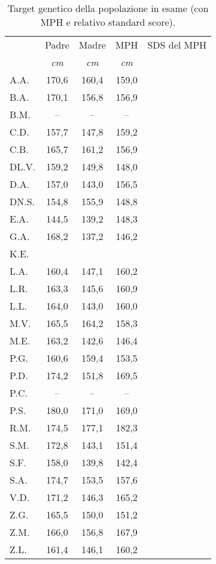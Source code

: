 \begin{table}[!h]
\begin{center}
\addtolength{\tabcolsep}{12pt}
\renewcommand{\arraystretch}{1.1}
\begin{tabular}{lcccc}
\toprule

 & Padre & Madre & MPH & SDS del MPH \\
 & \emph{cm} & \emph{cm} & \emph{cm} & \\
\midrule
A.A.	& 170,6 & 160,4 & 159,0 &  \\
B.A.	& 170,1 & 156,8 & 156,9 &  \\
B.M.	& --    & --    & --    &  \\
C.D.	& 157,7 & 147,8 & 159,2 &  \\
C.B.	& 165,7 & 161,2 & 156,9 &  \\
DL.V.	& 159,2 & 149,8 & 148,0 &  \\
D.A.	& 157,0 & 143,0 & 156,5 &  \\
DN.S.	& 154,8 & 155,9 & 148,8 &  \\
E.A.	& 144,5 & 139,2 & 148,3 &  \\
G.A.	& 168,2 & 137,2 & 146,2 &  \\
K.E.	&  &  &  &  \\
L.A.	& 160,4 & 147,1 & 160,2 &  \\
L.R.	& 163,3 & 145,6 & 160,9 &  \\
L.L.	& 164,0 & 143,0 & 160,0 &  \\
M.V.	& 165,5 & 164,2 & 158,3 &  \\
M.E.	& 163,2 & 142,6 & 146,4 &  \\
P.G.	& 160,6 & 159,4 & 153,5 &  \\
P.D.	& 174,2 & 151,8 & 169,5 &  \\
P.C.	& --    & --    & --    &  \\
P.S.	& 180,0 & 171,0 & 169,0 &  \\
R.M.	& 174,5 & 177,1 & 182,3 &  \\
S.M.	& 172,8 & 143,1 & 151,4 &  \\
S.F.	& 158,0 & 139,8 & 142,4 &  \\
S.A.	& 174,7 & 153,5 & 157,6 &  \\
V.D.	& 171,2 & 146,3 & 165,2 &  \\
Z.G.	& 165,5 & 150,0 & 151,2 &  \\
Z.M.	& 166,0 & 156,8 & 167,9 &  \\
Z.L.	& 161,4 & 146,1 & 160,2 &  \\
\bottomrule
\end{tabular}
\end{center}
\caption{Target genetico della popolazione in esame (con MPH e relativo standard score).}
\label{tab:TargetGenetici}
\end{table}

